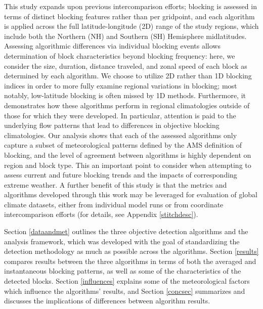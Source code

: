 \documentclass[smallextended]{svjour3}       %
\numberwithin{equation}{section}
\begin{document}
This study expands upon previous intercomparison efforts; blocking is assessed in terms of distinct blocking features rather than per gridpoint, and each algorithm is applied across the full latitude-longitude (2D) range of the study regions, which include both the Northern (NH) and Southern (SH) Hemisphere midlatitudes. Assessing algorithmic differences via individual blocking events allows determination of block characteristics beyond blocking frequency: here, we consider the size, duration, distance traveled, and zonal speed of each block as determined by each algorithm. 
We choose to utilize 2D rather than 1D blocking indices in order to more fully examine regional variations in blocking; most notably, low-latitude blocking is often missed by 1D methods. Furthermore, it demonstrates how these algorithms perform in regional climatologies outside of those for which they were developed. In particular, attention is paid to the underlying flow patterns that lead to differences in objective blocking climatologies. Our analysis shows that each of the assessed algorithms only capture a subset of meteorological patterns defined by the AMS definition of blocking, and the level of agreement between algorithms is highly dependent on region and block type.  This an important point to consider when attempting to assess current and future blocking trends and the impacts of corresponding extreme weather.  A further benefit of this study is that the metrics and algorithms developed through this work may be leveraged for evaluation of global climate datasets, either from individual model runs or from coordinate intercomparison efforts (for details, see Appendix \ref{stitchdesc}).


Section \ref{dataandmet} outlines the three objective detection algorithms and the analysis framework, which was developed with the goal of standardizing the detection methodology as much as possible across the algorithms. Section \ref{results} compares results between the three algorithms in terms of both the averaged and instantaneous blocking patterns, as well as some of the characteristics of the detected blocks. Section \ref{influences} explains some of the meteorological factors which influence the algorithms' results, and Section \ref{concsec} summarizes and discusses the implications of differences between algorithm results. 
\end{document}
